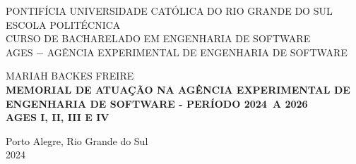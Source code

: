 \author{Mariah}

\def\autor{\uppercase{Mariah Backes Freire}}
\def\inicio{2024}
\def\fim{2026}
\def\ages{I, II, III E IV}
\def\local{Porto Alegre, Rio Grande do Sul}
\def\ano{2024}

\begin{capa}
  \centering
    \uppercase{
      PONTIFÍCIA UNIVERSIDADE CATÓLICA DO RIO GRANDE DO SUL\\
      ESCOLA POLITÉCNICA\\
      CURSO DE BACHARELADO EM ENGENHARIA DE SOFTWARE\\
      AGES $-$ AGÊNCIA EXPERIMENTAL DE ENGENHARIA DE SOFTWARE\\
      }

    \vfill
    \autor\\
    \vfill
    \textbf{
      \uppercase{
        Memorial de atuação na Agência Experimental de Engenharia de Software 
        {-} Período \inicio\ a \fim\
        \\AGES \ages\
      }
    }
    
    \vfill

    \vfill
    \local\\
    \ano\
  \end{capa}